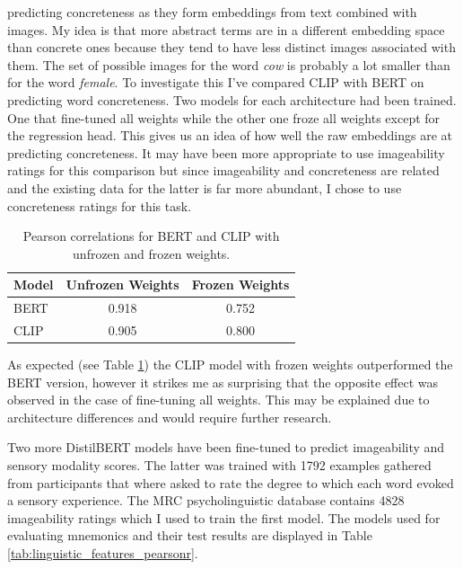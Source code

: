 predicting concreteness as they form embeddings from text combined with images. My idea is that more abstract terms are in a different embedding space than concrete ones because they tend to have less distinct images associated with them. The set of possible images for the word \emph{cow} is probably a lot smaller than for the word \emph{female}. To investigate this I've compared CLIP with BERT on predicting word concreteness. Two models for each architecture had been trained. One that fine-tuned all weights while the other one froze all weights except for the regression head. This gives us an idea of how well the raw embeddings are at predicting concreteness. It may have been more appropriate to use imageability ratings for this comparison but since imageability and concreteness are related and the existing data for the latter is far more abundant, I chose to use concreteness ratings for this task. 
\begin{table}[ht]
\centering
\begin{tabular}{@{}lcc@{}}
\toprule
Model & Unfrozen Weights & Frozen Weights \\ \midrule
BERT           & 0.918                     & 0.752                   \\
CLIP           & 0.905                     & 0.800                   \\ \bottomrule
\end{tabular}
\caption{Pearson correlations for BERT and CLIP with unfrozen and frozen weights.}
\label{tab:clip_bert_comparison}
\end{table}
As expected (see Table \ref{tab:clip_bert_comparison}) the CLIP model with frozen weights outperformed the BERT version, however it strikes me as surprising that the opposite effect was observed in the case of fine-tuning all weights. This may be explained due to architecture differences and would require further research.

Two more DistilBERT models have been fine-tuned to predict imageability and sensory modality scores. The latter was trained with 1792 examples \cite{Juhasz2013} gathered from participants that where asked to rate the degree to which each word evoked a sensory experience. The MRC psycholinguistic database \cite{mrc} contains 4828 imageability ratings which I used to train the first model. The models used for evaluating mnemonics and their test results are displayed in Table \ref{tab:linguistic_features_pearsonr}.


